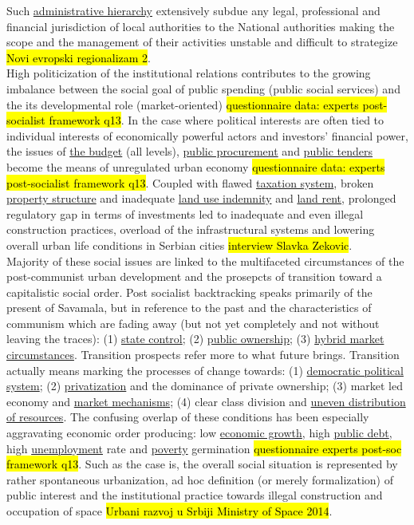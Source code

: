 \documentclass[11pt]{report}
\begin{document}
\begin{itemize}
Such \underline{administrative hierarchy} extensively subdue any legal, professional and financial jurisdiction of local authorities to the National authorities making the scope and the management of their activities unstable and difficult to strategize \hl{Novi evropski regionalizam 2}.
\\
High politicization of the institutional relations contributes to the growing imbalance between the social goal of public spending (public social services) and the its developmental role (market-oriented) \hl{questionnaire data: experts post-socialist framework q13}. In the case where political interests are often tied to individual interests of economically powerful actors and investors' financial power, the issues of \underline{the budget} (all levels), \underline{public procurement} and \underline{public tenders} become the means of unregulated urban economy \hl{questionnaire data: experts post-socialist framework q13}. Coupled with flawed \underline{taxation system}, broken \underline{property structure} and inadequate \underline{land use indemnity} and \underline{land rent}, prolonged regulatory gap in terms of investments led to inadequate and even illegal construction practices, overload of the infrastructural systems and lowering overall urban life conditions in Serbian cities \hl{interview Slavka Zekovic}.
\\
Majority of these social issues are linked to the multifaceted circumstances of the post-communist urban development and the prosepcts of transition toward a capitalistic social order.
Post socialist backtracking speaks primarily of the present of Savamala, but in reference to the past and the characteristics of communism which are fading away (but not yet completely and not without leaving the traces): (1) \underline{state control}; (2) \underline{public ownership}; (3) \underline{hybrid market circumstances}.
Transition prospects refer more to what future brings. Transition actually means marking the processes of change towards: (1) \underline{democratic political system}; (2) \underline{privatization} and the dominance of private ownership; (3) market led economy and \underline{market mechanisms}; (4) clear class division and \underline{uneven distribution of resources}.
The confusing overlap of these conditions has been especially aggravating economic order producing: low \underline{economic growth}, high \underline{public debt}, high \underline{unemployment} rate and \underline{poverty} germination \hl{questionnaire experts post-soc framework q13}.
Such as the case is, the overall social situation is represented by rather spontaneous urbanization, ad hoc definition (or merely formalization) of public interest and the  institutional practice towards illegal construction and occupation of space \hl{Urbani razvoj u Srbiji Ministry of Space 2014}.

\end{itemize}
\end{document}

